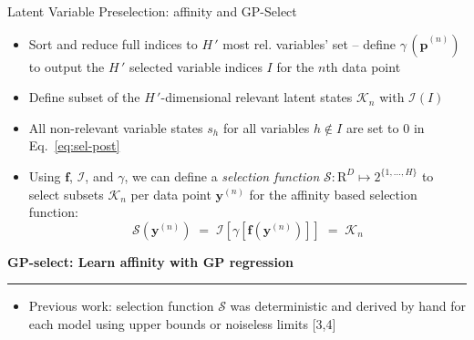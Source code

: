 \documentclass[final]{beamer}
\renewcommand{\vec}[1]{{\mathbf{#1}}}
\newcommand{\highlight}[1]{\textcolor{blocktbgn}{#1}}
\newcommand{\subhead}[1]{ \centering \textbf{#1}                                                                                                                                                                 \vskip-1.7\baselineskip~\\
\rule{\linewidth}{1pt}
\vspace{-0.9cm}
}
\renewcommand{\vec}[1]{{\mathbf{#1}}}
\newcommand{\Kn}{\mathcal{K}_{n}}
\begin{document}
\begin{frame}{}
\begin{columns}[t]
\begin{column}{.35\linewidth}
\begin{block}{Latent Variable Preselection: affinity and GP-Select}
\begin{itemize}
            \item \highlight{Sort and reduce} full indices to $H\,'$ most rel. variables' set -- define 
                  \highlight{$\gamma\,(\hat{\vec{p}}^{(n)})$} to output the \highlight{$H\,'$ selected variable indices $I$} for the $n$th data point
            \item \highlight{Define subset} of the $H\,'$-dimensional \highlight{relevant latent states $\Kn$} with \highlight{$\mathcal{I}(I)$} 
            \item All \highlight{non-relevant variable states} $s_h$ for all variables $h\not\in I$ are \highlight{set to $0$} in Eq.~\eqref{eq:sel-post} 
            \item Using $\vec{f}$, $\mathcal{I}$, and $\gamma$, we can define a 
            \highlight{\emph{selection function}} $\mathcal{S}: \mathrm{R}^D \mapsto 2^{ \{1,\dots,H \}}$ 
            to \highlight{select subsets $\mathcal{K}_n$} per data point $\vec{y}^{(n)}$ for
            the \highlight{affinity based selection function}:
            \vspace{.2cm}
            \begin{equation}\label{eq:sel-func}
            \mathcal{S}(\vec{y}^{(n)}) \;=\; \mathcal{I} \left[  \gamma \left[ \vec{f}(\vec{y}^{(n)}) \right]  \right] \;=\; \mathcal{K}_n
            \end{equation}
        \end{itemize}

      \vspace{.35cm}
      \subhead{GP-select: Learn affinity with GP regression}    
        \vspace{-.2cm}
           \begin{itemize}
            \setlength{\labelsep}{0.5em}

            \item \highlight{Previous work}: \highlight{selection function} $\mathcal{S}$ was \highlight{deterministic and derived by hand} for each model using upper bounds or noiseless limits [3,4]


\end{itemize}
\end{block}
\end{column}
\end{columns}
\end{frame}
\end{document}
